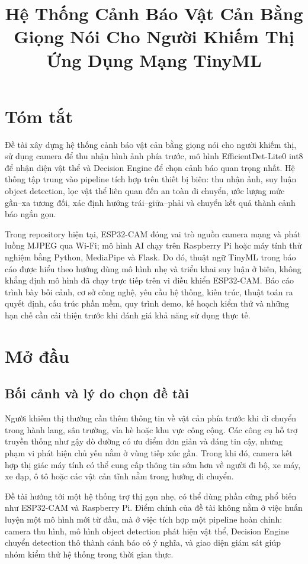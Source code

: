 \documentclass[oneside,final]{hcmut-report}
\title{Hệ Thống Cảnh Báo Vật Cản Bằng Giọng Nói Cho Người Khiếm Thị Ứng Dụng Mạng TinyML}
\begin{document}
\coverpage

\section*{Tóm tắt}
Đề tài xây dựng hệ thống cảnh báo vật cản bằng giọng nói cho người khiếm thị, sử dụng camera để thu nhận hình ảnh phía trước, mô hình EfficientDet-Lite0 int8 để nhận diện vật thể và Decision Engine để chọn cảnh báo quan trọng nhất. Hệ thống tập trung vào pipeline tích hợp trên thiết bị biên: thu nhận ảnh, suy luận object detection, lọc vật thể liên quan đến an toàn di chuyển, ước lượng mức gần--xa tương đối, xác định hướng trái--giữa--phải và chuyển kết quả thành cảnh báo ngắn gọn.

Trong repository hiện tại, ESP32-CAM đóng vai trò nguồn camera mạng và phát luồng MJPEG qua Wi-Fi; mô hình AI chạy trên Raspberry Pi hoặc máy tính thử nghiệm bằng Python, MediaPipe và Flask. Do đó, thuật ngữ TinyML trong báo cáo được hiểu theo hướng dùng mô hình nhẹ và triển khai suy luận ở biên, không khẳng định mô hình đã chạy trực tiếp trên vi điều khiển ESP32-CAM. Báo cáo trình bày bối cảnh, cơ sở công nghệ, yêu cầu hệ thống, kiến trúc, thuật toán ra quyết định, cấu trúc phần mềm, quy trình demo, kế hoạch kiểm thử và những hạn chế cần cải thiện trước khi đánh giá khả năng sử dụng thực tế.
\clearpage

\tableofcontents
\listoffigures
\listoftables
\clearpage

\section{Mở đầu}

\subsection{Bối cảnh và lý do chọn đề tài}
Người khiếm thị thường cần thêm thông tin về vật cản phía trước khi di chuyển trong hành lang, sân trường, vỉa hè hoặc khu vực công cộng. Các công cụ hỗ trợ truyền thống như gậy dò đường có ưu điểm đơn giản và đáng tin cậy, nhưng phạm vi phát hiện chủ yếu nằm ở vùng tiếp xúc gần. Trong khi đó, camera kết hợp thị giác máy tính có thể cung cấp thông tin sớm hơn về người đi bộ, xe máy, xe đạp, ô tô hoặc các vật cản tĩnh nằm trong hướng di chuyển.

Đề tài hướng tới một hệ thống trợ thị gọn nhẹ, có thể dùng phần cứng phổ biến như ESP32-CAM và Raspberry Pi. Điểm chính của đề tài không nằm ở việc huấn luyện một mô hình mới từ đầu, mà ở việc tích hợp một pipeline hoàn chỉnh: camera thu hình, mô hình object detection phát hiện vật thể, Decision Engine chuyển detection thô thành cảnh báo có ý nghĩa, và giao diện giám sát giúp nhóm kiểm thử hệ thống trong thời gian thực.
\end{document}
